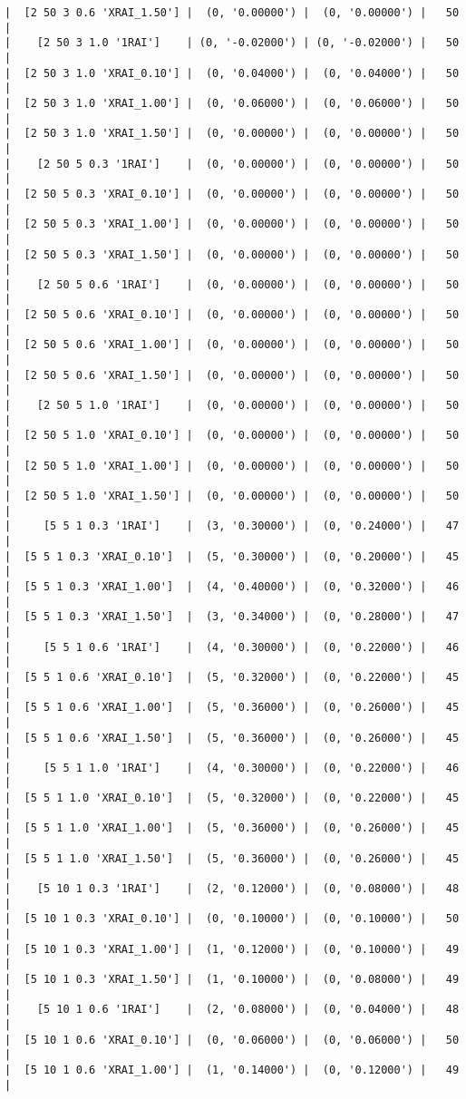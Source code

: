 \documentclass{article}
\begin{document}
\begin{verbatim}
|  [2 50 3 0.6 'XRAI_1.50'] |  (0, '0.00000') |  (0, '0.00000') |   50  |
|    [2 50 3 1.0 '1RAI']    | (0, '-0.02000') | (0, '-0.02000') |   50  |
|  [2 50 3 1.0 'XRAI_0.10'] |  (0, '0.04000') |  (0, '0.04000') |   50  |
|  [2 50 3 1.0 'XRAI_1.00'] |  (0, '0.06000') |  (0, '0.06000') |   50  |
|  [2 50 3 1.0 'XRAI_1.50'] |  (0, '0.00000') |  (0, '0.00000') |   50  |
|    [2 50 5 0.3 '1RAI']    |  (0, '0.00000') |  (0, '0.00000') |   50  |
|  [2 50 5 0.3 'XRAI_0.10'] |  (0, '0.00000') |  (0, '0.00000') |   50  |
|  [2 50 5 0.3 'XRAI_1.00'] |  (0, '0.00000') |  (0, '0.00000') |   50  |
|  [2 50 5 0.3 'XRAI_1.50'] |  (0, '0.00000') |  (0, '0.00000') |   50  |
|    [2 50 5 0.6 '1RAI']    |  (0, '0.00000') |  (0, '0.00000') |   50  |
|  [2 50 5 0.6 'XRAI_0.10'] |  (0, '0.00000') |  (0, '0.00000') |   50  |
|  [2 50 5 0.6 'XRAI_1.00'] |  (0, '0.00000') |  (0, '0.00000') |   50  |
|  [2 50 5 0.6 'XRAI_1.50'] |  (0, '0.00000') |  (0, '0.00000') |   50  |
|    [2 50 5 1.0 '1RAI']    |  (0, '0.00000') |  (0, '0.00000') |   50  |
|  [2 50 5 1.0 'XRAI_0.10'] |  (0, '0.00000') |  (0, '0.00000') |   50  |
|  [2 50 5 1.0 'XRAI_1.00'] |  (0, '0.00000') |  (0, '0.00000') |   50  |
|  [2 50 5 1.0 'XRAI_1.50'] |  (0, '0.00000') |  (0, '0.00000') |   50  |
|     [5 5 1 0.3 '1RAI']    |  (3, '0.30000') |  (0, '0.24000') |   47  |
|  [5 5 1 0.3 'XRAI_0.10']  |  (5, '0.30000') |  (0, '0.20000') |   45  |
|  [5 5 1 0.3 'XRAI_1.00']  |  (4, '0.40000') |  (0, '0.32000') |   46  |
|  [5 5 1 0.3 'XRAI_1.50']  |  (3, '0.34000') |  (0, '0.28000') |   47  |
|     [5 5 1 0.6 '1RAI']    |  (4, '0.30000') |  (0, '0.22000') |   46  |
|  [5 5 1 0.6 'XRAI_0.10']  |  (5, '0.32000') |  (0, '0.22000') |   45  |
|  [5 5 1 0.6 'XRAI_1.00']  |  (5, '0.36000') |  (0, '0.26000') |   45  |
|  [5 5 1 0.6 'XRAI_1.50']  |  (5, '0.36000') |  (0, '0.26000') |   45  |
|     [5 5 1 1.0 '1RAI']    |  (4, '0.30000') |  (0, '0.22000') |   46  |
|  [5 5 1 1.0 'XRAI_0.10']  |  (5, '0.32000') |  (0, '0.22000') |   45  |
|  [5 5 1 1.0 'XRAI_1.00']  |  (5, '0.36000') |  (0, '0.26000') |   45  |
|  [5 5 1 1.0 'XRAI_1.50']  |  (5, '0.36000') |  (0, '0.26000') |   45  |
|    [5 10 1 0.3 '1RAI']    |  (2, '0.12000') |  (0, '0.08000') |   48  |
|  [5 10 1 0.3 'XRAI_0.10'] |  (0, '0.10000') |  (0, '0.10000') |   50  |
|  [5 10 1 0.3 'XRAI_1.00'] |  (1, '0.12000') |  (0, '0.10000') |   49  |
|  [5 10 1 0.3 'XRAI_1.50'] |  (1, '0.10000') |  (0, '0.08000') |   49  |
|    [5 10 1 0.6 '1RAI']    |  (2, '0.08000') |  (0, '0.04000') |   48  |
|  [5 10 1 0.6 'XRAI_0.10'] |  (0, '0.06000') |  (0, '0.06000') |   50  |
|  [5 10 1 0.6 'XRAI_1.00'] |  (1, '0.14000') |  (0, '0.12000') |   49  |

\end{verbatim}
\end{document}
